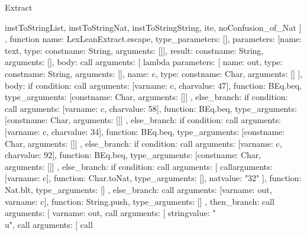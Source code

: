 \begin{lexlean}{Extract}
\begin{toolingmodule}
{{        instToStringList,
        instToStringNat,
        instToStringString,
        ite,
        noConfusion_of_Nat
      ]
    },
    function{
      name: LexLeanExtract.escape,
      type_parameters: [],
      parameters: [{name: text, type: const{name: String, arguments: []}}],
      result: const{name: String, arguments: []},
      body: call{
        arguments: [
          lambda{
            parameters: [
              {name: out, type: const{name: String, arguments: []}},
              {name: c, type: const{name: Char, arguments: []}}
            ],
            body: if{
              condition: call{
                arguments: [var{name: c}, char{value: 47}],
                function: BEq.beq,
                type_arguments: [const{name: Char, arguments: []}]
              },
              else_branch: if{
                condition: call{
                  arguments: [var{name: c}, char{value: 58}],
                  function: BEq.beq,
                  type_arguments: [const{name: Char, arguments: []}]
                },
                else_branch: if{
                  condition: call{
                    arguments: [var{name: c}, char{value: 34}],
                    function: BEq.beq,
                    type_arguments: [const{name: Char, arguments: []}]
                  },
                  else_branch: if{
                    condition: call{
                      arguments: [var{name: c}, char{value: 92}],
                      function: BEq.beq,
                      type_arguments: [const{name: Char, arguments: []}]
                    },
                    else_branch: if{
                      condition: call{
                        arguments: [
                          call{arguments: [var{name: c}], function: Char.toNat, type_arguments: []},
                          nat{value: "32"}
                        ],
                        function: Nat.blt,
                        type_arguments: []
                      },
                      else_branch: call{
                        arguments: [var{name: out}, var{name: c}],
                        function: String.push,
                        type_arguments: []
                      },
                      then_branch: call{
                        arguments: [
                          var{name: out},
                          call{
                            arguments: [
                              string{value: "\\u"},
                              call{
                                arguments: [
                                  call{
}}}}}}}}}}}}}
\end{toolingmodule}
\end{lexlean}
